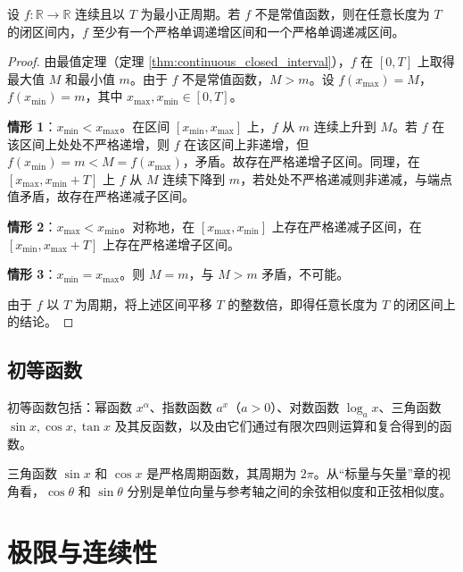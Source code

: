 \begin{theorem}[周期函数在一个周期内的单调区间]\label{thm:periodic_monotone_intervals}
设 $f: \mathbb{R} \to \mathbb{R}$ 连续且以 $T$ 为最小正周期。若 $f$ 不是常值函数，则在任意长度为 $T$ 的闭区间内，$f$ 至少有一个严格单调递增区间和一个严格单调递减区间。
\end{theorem}

\begin{proof}
由最值定理（定理 \ref{thm:continuous_closed_interval}），$f$ 在 $[0,T]$ 上取得最大值 $M$ 和最小值 $m$。由于 $f$ 不是常值函数，$M > m$。设 $f(x_{\max}) = M$，$f(x_{\min}) = m$，其中 $x_{\max}, x_{\min} \in [0,T]$。

\textbf{情形 1}：$x_{\min} < x_{\max}$。在区间 $[x_{\min}, x_{\max}]$ 上，$f$ 从 $m$ 连续上升到 $M$。若 $f$ 在该区间上处处不严格递增，则 $f$ 在该区间上非递增，但 $f(x_{\min}) = m < M = f(x_{\max})$，矛盾。故存在严格递增子区间。同理，在 $[x_{\max}, x_{\min}+T]$ 上 $f$ 从 $M$ 连续下降到 $m$，若处处不严格递减则非递减，与端点值矛盾，故存在严格递减子区间。

\textbf{情形 2}：$x_{\max} < x_{\min}$。对称地，在 $[x_{\max}, x_{\min}]$ 上存在严格递减子区间，在 $[x_{\min}, x_{\max}+T]$ 上存在严格递增子区间。

\textbf{情形 3}：$x_{\min} = x_{\max}$。则 $M = m$，与 $M > m$ 矛盾，不可能。

由于 $f$ 以 $T$ 为周期，将上述区间平移 $T$ 的整数倍，即得任意长度为 $T$ 的闭区间上的结论。
\end{proof}

\subsection{\texorpdfstring{初等函数}{初等函数}}

\begin{definition}[初等函数]\label{def:elementary_functions}
初等函数包括：幂函数 $x^\alpha$、指数函数 $a^x$（$a>0$）、对数函数 $\log_a x$、三角函数 $\sin x, \cos x, \tan x$ 及其反函数，以及由它们通过有限次四则运算和复合得到的函数。
\end{definition}

\begin{remark}[三角函数的相似度解读]\label{rem:trig_similarity}
三角函数 $\sin x$ 和 $\cos x$ 是严格周期函数，其周期为 $2\pi$。从“标量与矢量”章的视角看，$\cos\theta$ 和 $\sin\theta$ 分别是单位向量与参考轴之间的余弦相似度和正弦相似度。
\end{remark}

\section{\texorpdfstring{极限与连续性}{极限与连续性}}


